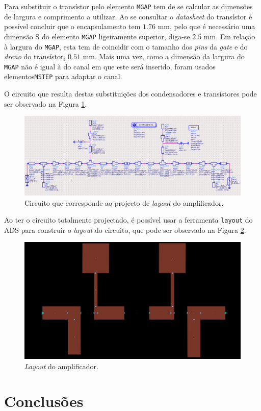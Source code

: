 \documentclass[11pt]{article}
\numberwithin{equation}{section}
\begin{document}
Para substituir o transístor pelo elemento \texttt{MGAP} tem de se calcular as dimensões de largura e comprimento a utilizar. Ao se consultar o \textit{datasheet} do transístor é possível concluir que o encapsulamento tem $1.76$ mm, pelo que é necessário uma dimensão S do elemento \texttt{MGAP} ligeiramente superior, diga-se $2.5$ mm. Em relação à largura do \texttt{MGAP}, esta tem de coincidir com o tamanho dos \textit{pins} da \textit{gate} e do \textit{dreno} do transístor, $0.51$ mm. Mais uma vez, como a dimensão da largura do \texttt{MGAP} não é igual à do canal em que este será inserido, foram usados elementos\texttt{MSTEP} para adaptar o canal.

O circuito que resulta destas substituições dos condensadores e transístores pode ser observado na Figura \ref{fig:Circuito_layout}.

\begin{figure}[H]
	\centering
	\includegraphics[keepaspectratio=true, scale=0.45]{exps/Circuito_layout}
	\vspace{-0.5em}
	\caption{Circuito que corresponde ao projecto de \textit{layout} do amplificador.}
	\vspace{-0.8em}
	\label{fig:Circuito_layout}
\end{figure}

Ao ter o circuito totalmente projectado, é possível usar a ferramenta \texttt{layout} do ADS para construir o \textit{layout} do circuito, que pode ser observado na Figura \ref{fig:layout}.

\begin{figure}[H]
	\centering
	\includegraphics[keepaspectratio=true, scale=0.45]{exps/layout}
	\vspace{-0.5em}
	\caption{\textit{Layout} do amplificador.}
	\vspace{-0.8em}
	\label{fig:layout}
\end{figure}

\section{Conclusões}
\end{document}
